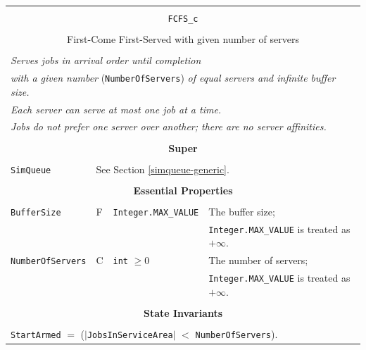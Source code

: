 \documentclass[12pt]{book}
\begin{document}
\begin{tabular}{|l|l|l|l|}
\hline
\multicolumn{4}{|c|}{} \\
\multicolumn{4}{|c|}{\lstinline[basicstyle=\large]{FCFS_c}} \\
\multicolumn{4}{|c|}{} \\
\multicolumn{4}{|c|}{First-Come First-Served with given number of servers} \\
\multicolumn{4}{|c|}{} \\
\hline
\multicolumn{4}{|l|}{\em Serves jobs in arrival order until completion\/} \\
\multicolumn{4}{|l|}{{\em with a given number\/} (\lstinline|NumberOfServers|)
                     {\em of equal servers and infinite buffer size.}} \\
\multicolumn{4}{|l|}{\em Each server can serve at most one job at a time.} \\
\multicolumn{4}{|l|}{\em Jobs do not prefer one server over another; there are no server affinities.} \\
\hline
\multicolumn{4}{|c|}{} \\
\multicolumn{4}{|c|}{\bf Super} \\
\multicolumn{4}{|c|}{} \\
\hline
\lstinline|SimQueue| & \multicolumn{3}{|l|}{See Section \ref{simqueue-generic}.} \\
\hline
\multicolumn{4}{|c|}{} \\
\multicolumn{4}{|c|}{\bf Essential Properties} \\
\multicolumn{4}{|c|}{} \\
\hline
\lstinline|BufferSize|      & F & \lstinline|Integer.MAX_VALUE|
                            & The buffer size; \\
                        & & & \lstinline|Integer.MAX_VALUE| is treated as $+\infty$. \\
\hline
\lstinline|NumberOfServers| & C & \lstinline|int| $\geq 0$
                            & The number of servers; \\
                        & & & \lstinline|Integer.MAX_VALUE| is treated as $+\infty$. \\
\hline
\multicolumn{4}{|c|}{} \\
\multicolumn{4}{|c|}{\bf State  Invariants} \\
\multicolumn{4}{|c|}{} \\
\hline
\multicolumn{4}{|l|}{\lstinline|StartArmed| $=$ ($|$\lstinline|JobsInServiceArea|$|$ $<$ \lstinline|NumberOfServers|).} \\

\end{tabular}
\end{document}

